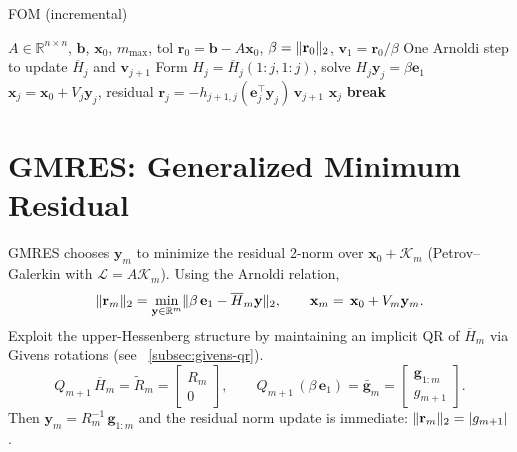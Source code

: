 \begin{algorithm}[ht]
  \caption{FOM (incremental)}
  \label{alg:fom-lecture}
  \begin{algorithmic}[0]
    \Require $A\in\mathbb{R}^{n\times n}$, $\mathbf{b}$, $\mathbf{x}_0$, $m_{\max}$, tol
    \State $\mathbf{r}_0=\mathbf{b}-A\mathbf{x}_0$, $\beta=\lVert\mathbf{r}_0\rVert_2$, $\mathbf{v}_1=\mathbf{r}_0/\beta$
    \State One Arnoldi step to update $\overline H_j$ and $\mathbf{v}_{j+1}$
    \State Form $H_j=\overline H_j(1{:}j,1{:}j)$, solve $H_j\mathbf{y}_j=\beta\mathbf{e}_1$
    \State $\mathbf{x}_j=\mathbf{x}_0+V_j\mathbf{y}_j$, residual $\mathbf{r}_j = -h_{j+1,j}(\mathbf{e}_j^{\top}\mathbf{y}_j)\,\mathbf{v}_{j+1}$
     \Return $\mathbf{x}_j$ \EndIf
     \State \textbf{break}  \EndIf
    \EndFor
  \end{algorithmic}
\end{algorithm}

\section{GMRES: Generalized Minimum Residual}
GMRES chooses $\mathbf{y}_m$ to minimize the residual 2-norm over $\mathbf{x}_0+\mathcal{K}_m$ (Petrov--Galerkin with $\mathcal{L}=A\mathcal{K}_m$). Using the Arnoldi relation,
\[
  \lVert\mathbf{r}_m\rVert_2 = \min_{\mathbf{y}\in\mathbb{R}^m} \lVert\beta\,\mathbf{e}_1 - \overline H_m\mathbf{y}\rVert_2,\qquad \mathbf{x}_m=\mathbf{\,x}_0+V_m\mathbf{y}_m.
\]
Exploit the upper-Hessenberg structure by maintaining an implicit QR of $\overline H_m$ via Givens rotations (see ~\autoref{subsec:givens-qr}).
\[
  Q_{m+1}\,\overline H_m = \tilde{R}_m = \begin{bmatrix} R_m \\ 0 \end{bmatrix},\qquad Q_{m+1}\,(\beta\,\mathbf{e}_1)=\bar{\mathbf{g}}_m=\begin{bmatrix}\mathbf{g}_{1:m}\\g_{m+1}\end{bmatrix}.
\]
Then $\mathbf{y}_m = R_m^{-1}\,\mathbf{g}_{1:m}$ and the residual norm update is immediate: $\lVert\mathbf{r}_m\rVert_2 = |g_{m+1}|$.

